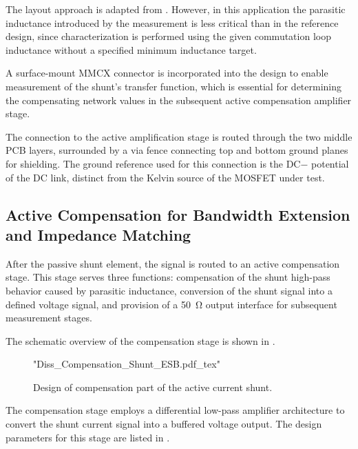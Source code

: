 The layout approach is adapted from \cite{shillaber_gigahertz_2020}. 
However, in this application the parasitic inductance introduced by the measurement is less critical than in the reference design, since characterization is performed using the given commutation loop inductance  without a specified minimum inductance target.

A surface-mount MMCX connector is incorporated into the design to enable measurement of the shunt's transfer function, which is essential for determining the compensating network values in the subsequent active compensation amplifier stage. 

The connection to the active amplification stage is routed through the two middle PCB layers, surrounded by a via fence connecting top and bottom ground planes for shielding. 
The ground reference used for this connection is the DC− potential of the DC link, distinct from the Kelvin source of the MOSFET under test. 



\subsection{Active Compensation for Bandwidth Extension and Impedance Matching}
After the passive shunt element, the signal is routed to an active compensation stage.
This stage serves three functions: compensation of the shunt high-pass behavior caused by parasitic inductance, conversion of the shunt signal into a defined voltage signal, and provision of a \SI{50}{\ohm} output interface for subsequent measurement stages.

The schematic overview of the compensation stage is shown in .

\begin{figure}[ht]
	\centering
	{"Diss_Compensation_Shunt_ESB.pdf_tex"}
	\caption{Design of compensation part of the active current shunt.}\label{fig:ESBCompensation}
\end{figure}


The compensation stage employs a differential low-pass amplifier architecture to convert the shunt current signal into a buffered voltage output.
The design parameters for this stage are listed in .

